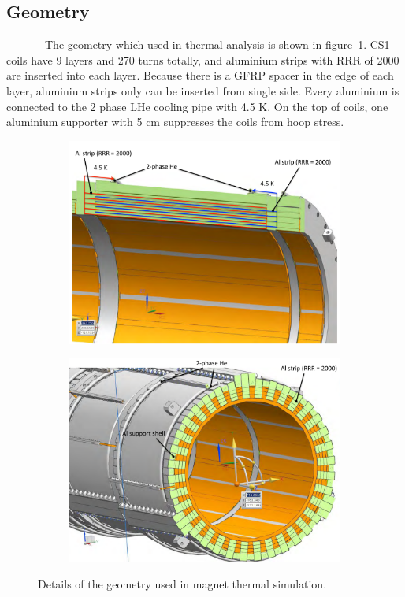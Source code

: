   \subsection{Geometry}
~~~~~~~The geometry which used in thermal analysis is shown in figure~\ref{4geo}.
CS1 coils have 9 layers and 270 turns totally, and aluminium strips with RRR of 2000 are inserted into each layer.
Because there is a GFRP spacer in the edge of each layer, aluminium strips only can be inserted from single side.
Every aluminium is connected to the 2 phase LHe cooling pipe with 4.5 K.
On the top of coils, one aluminium supporter with 5 cm suppresses the coils from hoop stress.
 \begin{figure}[H]
   \begin{subfigure}{0.3\textwidth}
    \centering
    \includegraphics[scale=0.29]{chapter5/fig/geo.pdf}
   \end{subfigure}
   \hspace{0.2\textwidth}
   \begin{subfigure}{0.3\textwidth}
    \centering
	\includegraphics[scale=0.29]{chapter5/fig/geo2.pdf}
   \end{subfigure}
   \caption{Details of the geometry used in magnet thermal simulation.}
   \label{4geo}
  \end{figure}
 
